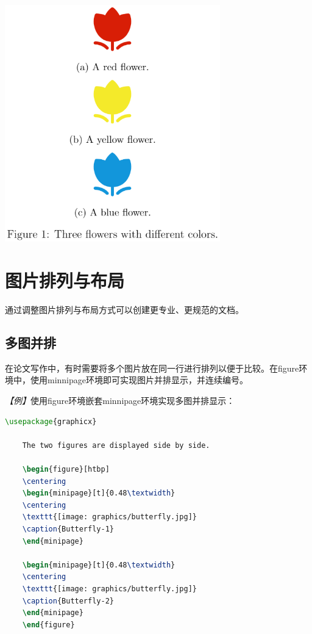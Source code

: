 \begin{center}
    \includegraphics[width = 0.7\textwidth]{images/eg_11.png}
    \label{fig:4}
\end{center}

\section{图片排列与布局}

通过调整图片排列与布局方式可以创建更专业、更规范的文档。

\subsection{多图并排}

在论文写作中，有时需要将多个图片放在同一行进行排列以便于比较。在figure环境中，使用minnipage环境即可实现图片并排显示，并连续编号。

\emph{【例】}使用figure环境嵌套minnipage环境实现多图并排显示：
\begin{lstlisting}[language=TeX]
    \usepackage{graphicx}

    The two figures are displayed side by side.

    \begin{figure}[htbp]
    \centering
    \begin{minipage}[t]{0.48\textwidth} 
    \centering
    \texttt{[image: graphics/butterfly.jpg]}
    \caption{Butterfly-1}
    \end{minipage}

    \begin{minipage}[t]{0.48\textwidth}
    \centering
    \texttt{[image: graphics/butterfly.jpg]}
    \caption{Butterfly-2}
    \end{minipage}
    \end{figure}
\end{lstlisting}


